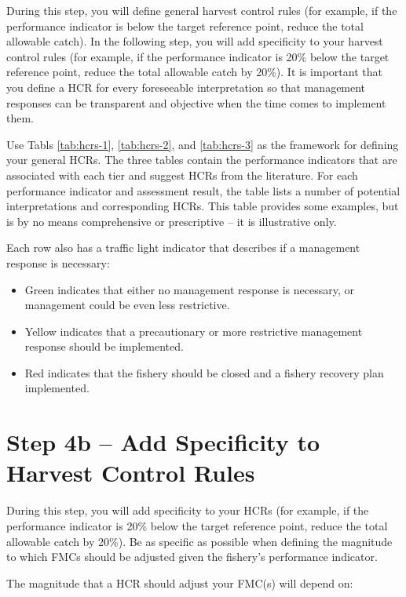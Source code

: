 \documentclass[]{book}
\begin{document}
During this step, you will define general harvest control rules (for
example, if the performance indicator is below the target reference
point, reduce the total allowable catch). In the following step, you
will add specificity to your harvest control rules (for example, if the
performance indicator is 20\% below the target reference point, reduce
the total allowable catch by 20\%). It is important that you define a
HCR for every foreseeable interpretation so that management responses
can be transparent and objective when the time comes to implement them.

Use Tabls \ref{tab:hcrs-1}, \ref{tab:hcrs-2}, and \ref{tab:hcrs-3} as
the framework for defining your general HCRs. The three tables contain
the performance indicators that are associated with each tier and
suggest HCRs from the literature. For each performance indicator and
assessment result, the table lists a number of potential interpretations
and corresponding HCRs. This table provides some examples, but is by no
means comprehensive or prescriptive -- it is illustrative only.

Each row also has a traffic light indicator that describes if a
management response is necessary:

\begin{itemize}
\item
  Green indicates that either no management response is necessary, or
  management could be even less restrictive.
\item
  Yellow indicates that a precautionary or more restrictive management
  response should be implemented.
\item
  Red indicates that the fishery should be closed and a fishery recovery
  plan implemented.
\end{itemize}

\section{Step 4b -- Add Specificity to Harvest Control
Rules}\label{step-4b-add-specificity-to-harvest-control-rules}

During this step, you will add specificity to your HCRs (for example, if
the performance indicator is 20\% below the target reference point,
reduce the total allowable catch by 20\%). Be as specific as possible
when defining the magnitude to which FMCs should be adjusted given the
fishery's performance indicator.

The magnitude that a HCR should adjust your FMC(s) will depend on:
\end{document}
